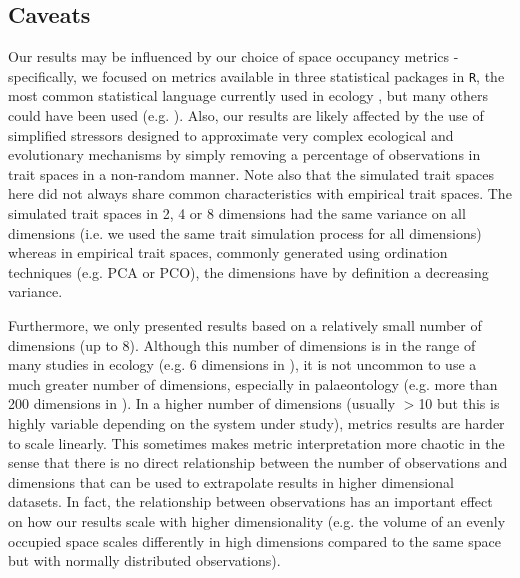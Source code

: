 \documentclass[12pt,letterpaper]{article}
\begin{document}
\subsection{Caveats}

Our results may be influenced by our choice of space occupancy metrics - specifically, we focused on metrics available in three statistical packages in \texttt{R}, the most common statistical language currently used in ecology \citep{lai2019evaluating}, but many others could have been used (e.g. \citealt{guillerme2020shifting}).
Also, our results are likely affected by the use of simplified stressors designed to approximate very complex ecological and evolutionary mechanisms by simply removing a percentage of observations in trait spaces in a non-random manner.
Note also that the simulated trait spaces here did not always share common characteristics with empirical trait spaces.
The simulated trait spaces in 2, 4 or 8 dimensions had the same variance on all dimensions (i.e. we used the same trait simulation process for all dimensions) whereas in empirical trait spaces, commonly generated using ordination techniques (e.g. PCA or PCO), the dimensions have by definition a decreasing variance.

Furthermore, we only presented results based on a relatively small number of dimensions (up to 8).
Although this number of dimensions is in the range of many studies in ecology (e.g. 6 dimensions in \citealt{healy2019animal}), it is not uncommon to use a much greater number of dimensions, especially in palaeontology (e.g. more than 200 dimensions in \citealt{van2023should}).
In a higher number of dimensions (usually $>$10 but this is highly variable depending on the system under study), metrics results are harder to scale linearly.
This sometimes makes metric interpretation more chaotic \cite{bellman1957dynamic} in the sense that there is no direct relationship between the number of observations and dimensions that can be used to extrapolate results in higher dimensional datasets.
In fact, the relationship between observations has an important effect on how our results scale with higher dimensionality (e.g. the volume of an evenly occupied space scales differently in high dimensions compared to the same space but with normally distributed observations).
\end{document}
